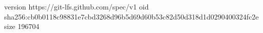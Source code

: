 version https://git-lfs.github.com/spec/v1
oid sha256:cb0b0118c98831e7cbd3268d96b5d69d60b53c82d50d318d1d0290400324fc2e
size 196704
